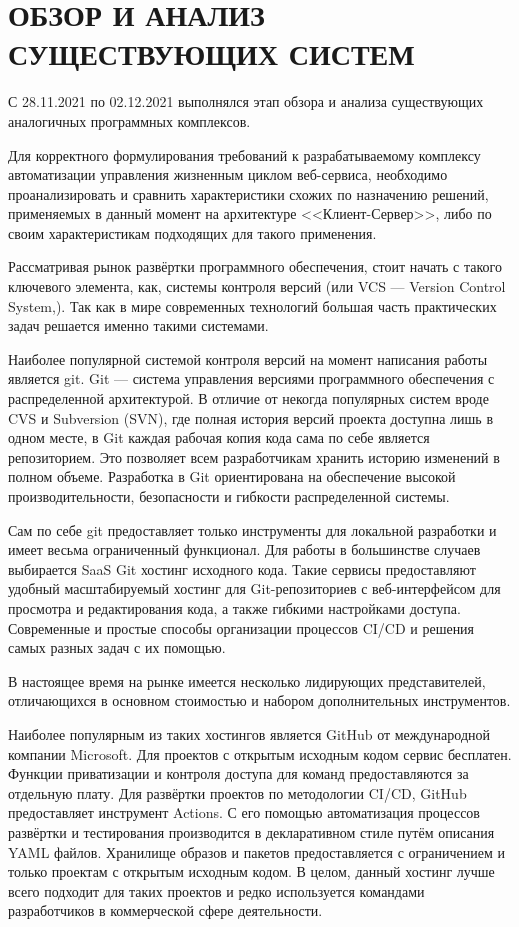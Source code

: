 \section{ОБЗОР И АНАЛИЗ СУЩЕСТВУЮЩИХ СИСТЕМ}

С 28.11.2021 по 02.12.2021 выполнялся этап обзора и анализа существующих аналогичных программных комплексов.

Для корректного формулирования требований к разрабатываемому комплексу автоматизации управления жизненным циклом веб-сервиса,
необходимо проанализировать и сравнить характеристики схожих по назначению решений, применяемых в данный момент на архитектуре <<Клиент-Сервер>>,
либо по своим характеристикам подходящих для такого применения.

Рассматривая рынок развёртки программного обеспечения, стоит начать с такого ключевого элемента, как, системы контроля версий (или VCS --- Version Control System,).
Так как в мире современных технологий большая часть практических задач решается именно такими системами.

Наиболее популярной системой контроля версий на момент написания работы является git.
Git --- система управления версиями программного обеспечения с распределенной архитектурой.
В отличие от некогда популярных систем вроде CVS и Subversion (SVN),
где полная история версий проекта доступна лишь в одном месте,
в Git каждая рабочая копия кода сама по себе является репозиторием.
Это позволяет всем разработчикам хранить историю изменений в полном объеме.
Разработка в Git ориентирована на обеспечение высокой производительности, безопасности и гибкости распределенной системы.

Сам по себе git предоставляет только инструменты для локальной разработки и имеет весьма ограниченный функционал.
Для работы в большинстве случаев выбирается SaaS Git хостинг исходного кода.
Такие сервисы предоставляют удобный масштабируемый хостинг для Git-репозиториев с веб-интерфейсом для просмотра и редактирования кода,
а также гибкими настройками доступа.
Современные и простые способы организации процессов CI/CD и решения самых разных задач с их помощью.

В настоящее время на рынке имеется несколько лидирующих представителей, отличающихся в основном стоимостью и набором дополнительных инструментов.

Наиболее популярным из таких хостингов является GitHub от международной компании Microsoft.
Для проектов с открытым исходным кодом сервис бесплатен.
Функции приватизации и контроля доступа для команд предоставляются за отдельную плату.
Для развёртки проектов по методологии CI/CD, GitHub предоставляет инструмент Actions.
С его помощью автоматизация процессов развёртки и тестирования производится в декларативном стиле путём описания YAML файлов.
Хранилище образов и пакетов предоставляется с ограничением и только проектам с открытым исходным кодом.
В целом, данный хостинг лучше всего подходит для таких проектов и редко используется командами разработчиков в коммерческой сфере деятельности.

